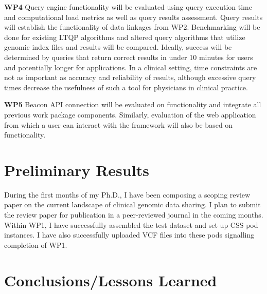 \documentclass[runningheads]{llncs}
\begin{document}
\textbf{WP4}
Query engine functionality will be evaluated using query execution time and computational load metrics as well as query results assessment. 
Query results will establish the functionality of data linkages from WP2.
Benchmarking will be done for existing LTQP algorithms and altered query algorithms that utilize genomic index files and results will be compared.
Ideally, success will be determined by queries that return correct results in under 10 minutes for users and potentially longer for applications.
In a clinical setting, time constraints are not as important as accuracy and reliability of results, although excessive query times decrease the usefulness of such a tool for physicians in clinical practice.

\textbf{WP5}
Beacon API connection will be evaluated on functionality and integrate all previous work package components. 
Similarly, evaluation of the web application from which a user can interact with the framework will also be based on functionality.


\section{Preliminary Results}

During the first months of my Ph.D., I have been composing a scoping review paper on the current landscape of clinical genomic data sharing.
I plan to submit the review paper for publication in a peer-reviewed journal in the coming months.
Within WP1, I have successfully assembled the test dataset and set up CSS pod instances.
I have also successfully uploaded VCF files into these pods signalling completion of WP1. 


\section{Conclusions/Lessons Learned}

\end{document}
